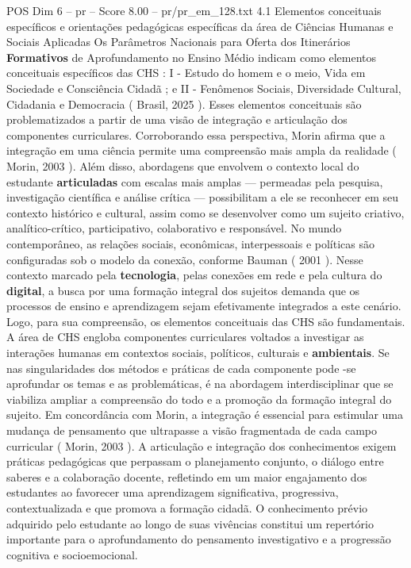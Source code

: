 \begin{textsample}{POS Dim 6 – pr – Score 8.00 – pr/pr\_em\_128.txt}  \label{ex:f6_pos_030}
4.1 Elementos conceituais específicos e orientações pedagógicas específicas da área de Ciências Humanas e Sociais Aplicadas Os Parâmetros Nacionais para Oferta dos Itinerários \textbf{Formativos} de Aprofundamento no Ensino Médio indicam como elementos conceituais específicos das CHS : I - Estudo do homem e o meio, Vida em Sociedade e Consciência Cidadã ; e II - Fenômenos Sociais, Diversidade Cultural, Cidadania e Democracia ( Brasil, 2025 ).
Esses elementos conceituais são problematizados a partir de uma visão de integração e articulação dos componentes curriculares.
Corroborando essa perspectiva, Morin afirma que a integração em uma ciência permite uma compreensão mais ampla da realidade ( Morin, 2003 ).
Além disso, abordagens que envolvem o contexto local do estudante \textbf{articuladas} com escalas mais amplas — permeadas pela pesquisa, investigação científica e análise crítica — possibilitam a ele se reconhecer em seu contexto histórico e cultural, assim como se desenvolver como um sujeito criativo, analítico-crítico, participativo, colaborativo e responsável.
No mundo contemporâneo, as relações sociais, econômicas, interpessoais e políticas são configuradas sob o modelo da conexão, conforme Bauman ( 2001 ).
Nesse contexto marcado pela \textbf{tecnologia}, pelas conexões em rede e pela cultura do \textbf{digital}, a busca por uma formação integral dos sujeitos demanda que os processos de ensino e aprendizagem sejam efetivamente integrados a este cenário.
Logo, para sua compreensão, os elementos conceituais das CHS são fundamentais.
A área de CHS engloba componentes curriculares voltados a investigar as interações humanas em contextos sociais, políticos, culturais e \textbf{ambientais}.
Se nas singularidades dos métodos e práticas de cada componente pode -se aprofundar os temas e as problemáticas, é na abordagem interdisciplinar que se viabiliza ampliar a compreensão do todo e a promoção da formação integral do sujeito.
Em concordância com Morin, a integração é essencial para estimular uma mudança de pensamento que ultrapasse a visão fragmentada de cada campo curricular ( Morin, 2003 ).
A articulação e integração dos conhecimentos exigem práticas pedagógicas que perpassam o planejamento conjunto, o diálogo entre saberes e a colaboração docente, refletindo em um maior engajamento dos estudantes ao favorecer uma aprendizagem significativa, progressiva, contextualizada e que promova a formação cidadã.
O conhecimento prévio adquirido pelo estudante ao longo de suas vivências constitui um repertório importante para o aprofundamento do pensamento investigativo e a progressão cognitiva e socioemocional.

\end{textsample}
